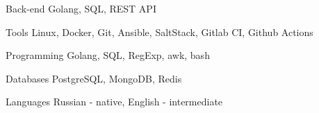 
\begin{cvskills}

  \cvskill
    {Back-end} %
    {Golang, SQL, REST API} %

  \cvskill
    {Tools} %
    {Linux, Docker, Git, Ansible, SaltStack, Gitlab CI, Github Actions} %


  \cvskill
    {Programming} %
    {Golang, SQL, RegExp, awk, bash} %

  \cvskill
    {Databases} %
    {PostgreSQL, MongoDB, Redis} %

  \cvskill
    {Languages} %
    {Russian - native, English - intermediate } %

\end{cvskills}
